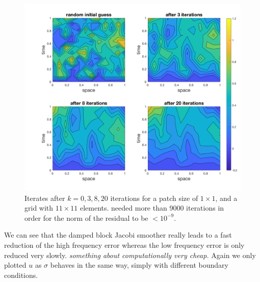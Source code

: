 \documentclass[../draft_1.tex]{subfiles}
\begin{document}

\begin{figure}[ht!]
	\centering
	\includegraphics[scale=0.28]{images/implementation/contour_plot_1_blk_size1by1}
	\caption{Iterates after $k = 0,3,8, 20$ iterations for a patch size of $1 \times 1$, and a grid with $11 \times 11$ elements. needed more than 9000 iterations in order for the norm of the residual to be $< 10^{-9}$.}
\end{figure}

We can see that the damped block Jacobi smoother really leads to a fast reduction of the high frequency error whereas the low frequency error is only reduced very slowly. \textit{something about computationally very cheap.} Again we only plotted $u$ as $\sigma$ behaves in the same way, simply with different boundary conditions. 
\end{document}
